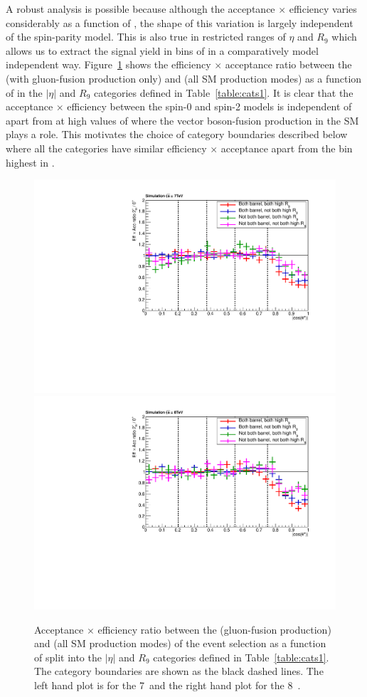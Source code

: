 A robust analysis is possible because although the acceptance $\times$ efficiency varies considerably as a function of \abscostheta, the shape of this variation is largely independent of the spin-parity model. This is also true in restricted ranges of $\eta$ and $R_{9}$ which allows us to extract the signal yield in bins of \abscostheta in a comparatively model independent way. 
Figure~\ref{fig:eff_acc} shows the efficiency $\times$ acceptance ratio between the \twomp (with gluon-fusion production only) and \zerop (all SM production modes) as a function of \abscostheta in the $|\eta|$ and $R_{9}$ categories defined in Table~\ref{table:cats1}. It is clear that the acceptance $\times$ efficiency between the spin-0 and spin-2 models is independent of \abscostheta apart from at high values of \abscostheta where the vector boson-fusion production in the SM plays a role. This motivates the choice of \abscostheta category boundaries described below where all the categories have similar efficiency $\times$ acceptance apart from the bin highest in \abscostheta.

\begin{figure}
	\begin{center}
	\includegraphics[width=0.49\linewidth]{analysis/plots/spin/effacccats_7TeV.pdf}
	\includegraphics[width=0.49\linewidth]{analysis/plots/spin/effacccats_8TeV.pdf}
  \caption[Acceptance $\times$ efficiency ratio between the \twomp (gluon fusion production) and \zerop (all SM production modes) of the spin analysis event selection]{Acceptance $\times$ efficiency ratio between the \twomp (gluon-fusion production) and \zerop (all SM production modes) of the event selection as a function of \abscostheta split into the $|\eta|$ and $R_{9}$ categories defined in Table~\ref{table:cats1}. The \abscostheta category boundaries are shown as the black dashed lines. The left hand plot is for the 7~\TeV and the right hand plot for the 8~\TeV.}
	\label{fig:eff_acc}
	\end{center}
\end{figure}	

